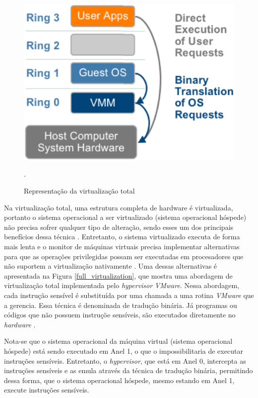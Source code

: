\begin{figure}[!htb]
\centering
\includegraphics [keepaspectratio=true,scale=0.3]{figuras/rings.eps}
\caption{Representação da virtualização total}
\cite{vmware}.
\label{rings}
\end{figure}


Na virtualização total, uma estrutura completa de hardware é virtualizada, portanto o sistema operacional a ser virtualizado (sistema operacional hóspede) não precisa sofrer qualquer tipo de alteração, sendo esses um dos principais benefícios dessa técnica \cite{marcos}. Entretanto, o sistema virtualizado executa de forma mais lenta e o monitor de máquinas virtuais precisa implementar alternativas para que as operações privilegidas possam ser executadas em procesadores que não suportem a virtualização nativamente \cite{marcos}. Uma dessas alternativas é apresentada na Figura \ref{full_virtualization}, que mostra uma abordagem de virtualização total implementada pelo \textit{hypervisor} \textit{VMware}. Nessa abordagem, cada instrução sensível é substituída por uma chamada a uma rotina \textit{VMware} que a gerencia. Essa técnica é denominada de tradução binária. Já programas ou códigos que não possuem instruçõe sensíveis, são executados diretamente no \textit{hardware} \cite{tanembaum}.

Nota-se que o sistema operacional da máquina virtual (sistema operacional hóspede) está sendo executado em Anel 1, o que o impossibilitaria de executar instruções sensíveis. Entretanto, o \textit{hypervisor}, que está em Anel 0, intercepta as instruções sensíveis e as emula através da técnica de tradução binária, permitindo dessa forma, que o sistema operacional hóspede, mesmo estando em Anel 1, execute instruções sensíveis.

